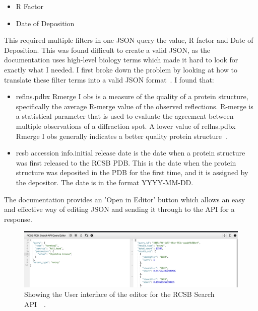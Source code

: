 \documentclass[]{final_report}
\begin{document}
\begin{itemize}
    \item R Factor
    \item Date of Deposition
\end{itemize}

This required multiple filters in one JSON query the value, R factor and Date of Deposition. This was found difficult to create a valid JSON, as the documentation uses high-level biology terms which made it hard to look for exactly what I needed. I first broke down the problem by looking at how to translate these filter terms into a valid JSON format~\cite{burley_rcsb_2019}. I found that: 

\begin{itemize}
    \item reflns.pdbx Rmerge I obs is a measure of the quality of a protein structure, specifically the average R-merge value of the observed reflections. R-merge is a statistical parameter that is used to evaluate the agreement between multiple observations of a diffraction spot. A lower value of reflns.pdbx Rmerge I obs generally indicates a better quality protein structure~\cite{worldwide_protein_data_bank_consortium_pdbxmmcif_nodate}.
    \item rcsb accession info.initial release date is the date when a protein structure was first released to the RCSB PDB. This is the date when the protein structure was deposited in the PDB for the first time, and it is assigned by the depositor. The date is in the format YYYY-MM-DD\cite{worldwide_protein_data_bank_consortium_pdbxmmcif_nodate}.
\end{itemize}

\clearpage

The documentation provides an 'Open in Editor' button which allows an easy and effective way of editing JSON and sending it through to the API for a response.

\begin{figure}[ht]
    \centering
    \includegraphics[width=1\textwidth]{SearchAPIEditor.png}
    \caption{\label{fig:SearchAPIEditor}Showing the User interface of the editor for the RCSB Search API~~\cite{burley_rcsb_2019}\cite{rose_rcsb_2021}.}
\end{figure}
\end{document}
